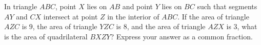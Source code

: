 In triangle $ABC$, point $X$ lies on $AB$ and point $Y$ lies on $BC$ such that segments $AY$ and $CX$ intersect at point $Z$ in the interior of $ABC$. If the area of triangle $AZC$ is $9$, the area of triangle $YZC$ is $8$, and the area of triangle $AZX$ is $3$, what is the area of quadrilateral $BXZY$? Express your answer as a common fraction.
